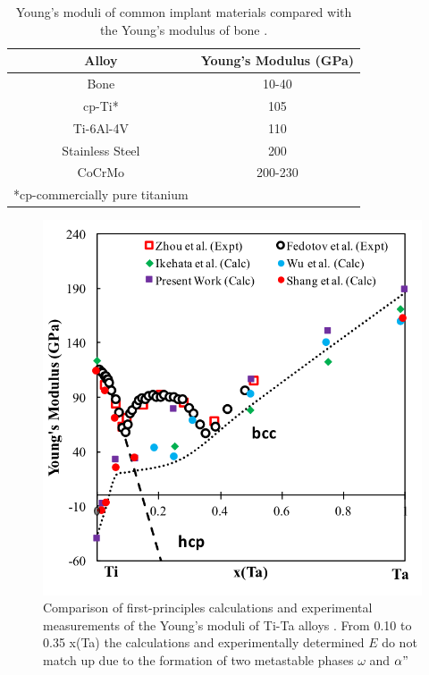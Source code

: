 \pagebreak
\begin{table}[H]
	\caption{Young's moduli of common implant materials compared with the Young's modulus of bone \cite{Long1998a}.}
	\centering
	\begin{tabular}{ c c }
		\hline
		Alloy & Young's Modulus (GPa) \\
		\hline
		Bone & 10-40\\
		cp-Ti* & 105\\
		Ti-6Al-4V & 110\\
		Stainless Steel & 200\\
		CoCrMo & 200-230\\
		\hline
		*cp-commercially pure titanium 
	\end{tabular}
\label{table:commonEM}
\end{table}
\clearpage

\newpage
\begin{figure}[H]
	\centering
	\includegraphics{Chapter-1/Figures/TiTaElastic.png}
	\caption{Comparison of first-principles calculations \cite{Wu2010a,Ikehata2004} and experimental measurements of the Young's moduli of Ti-Ta alloys \cite{Zhou2004a,Zhou2009a,Fedotov1985}. From 0.10 to 0.35 x(Ta) the calculations and experimentally determined $E$ do not match up due to the formation of two metastable phases $\omega$ and $\alpha"$}
	\label{Ch1-figure:titaelastic}
\end{figure}


